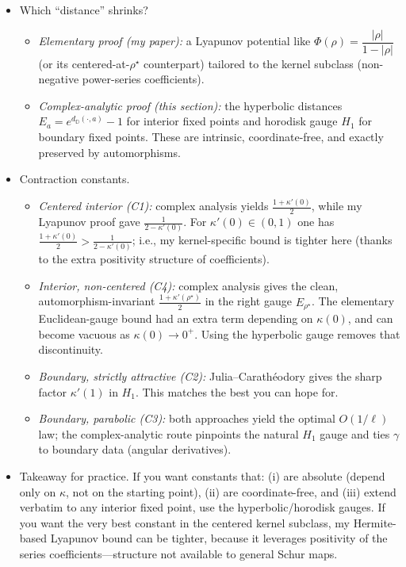 \documentclass[11pt]{article}
\begin{document}
\begin{itemize}
\item Which ``distance'' shrinks?
\begin{itemize}
\item \textit{Elementary proof (my paper):} a Lyapunov potential like $\Phi(\rho)=\dfrac{|\rho|}{1-|\rho|}$ (or its centered-at-$\rho^\star$ counterpart) tailored to the kernel subclass (non-negative power-series coefficients).
\item \textit{Complex-analytic proof (this section):} the hyperbolic distances $E_a=e^{d_{\mathbb{D}}(\cdot,a)}-1$ for interior fixed points and horodisk gauge $H_1$ for boundary fixed points. These are intrinsic, coordinate-free, and exactly preserved by automorphisms.
\end{itemize}

\item Contraction constants.
\begin{itemize}
\item \textit{Centered interior (C1):} complex analysis yields $\tfrac{1+\kappa'(0)}{2}$, while my Lyapunov proof gave $\tfrac{1}{2-\kappa'(0)}$. For $\kappa'(0)\in(0,1)$ one has $\tfrac{1+\kappa'(0)}{2}>\tfrac{1}{2-\kappa'(0)}$; i.e., my kernel-specific bound is tighter here (thanks to the extra positivity structure of coefficients).
\item \textit{Interior, non-centered (C4):} complex analysis gives the clean, automorphism-invariant $\tfrac{1+\kappa'(\rho^\star)}{2}$ in the right gauge $E_{\rho^\star}$. The elementary Euclidean-gauge bound had an extra term depending on $\kappa(0)$, and can become vacuous as $\kappa(0)\to0^{+}$. Using the hyperbolic gauge removes that discontinuity.
\item \textit{Boundary, strictly attractive (C2):} Julia–Carathéodory gives the {sharp} factor $\kappa'(1)$ in $H_1$. This matches the best you can hope for.
\item \textit{Boundary, parabolic (C3):} both approaches yield the optimal $O(1/\ell)$ law; the complex-analytic route pinpoints the natural $H_1$ gauge and ties $\gamma$ to boundary data (angular derivatives).
\end{itemize}

\item {Takeaway for practice.}
If you want constants that: (i) are {absolute} (depend only on $\kappa$, not on the starting point), (ii) are {coordinate-free}, and (iii) extend verbatim to any interior fixed point, use the hyperbolic/horodisk gauges. If you want the very best constant in the {centered kernel subclass}, my Hermite-based Lyapunov bound can be tighter, because it leverages positivity of the series coefficients—structure not available to general Schur maps.
\end{itemize}



\end{document}
